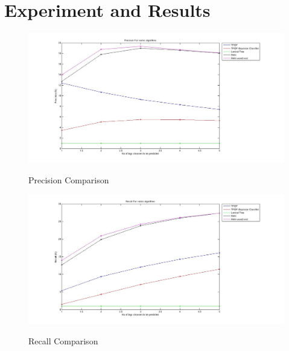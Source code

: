 \documentclass[dvips,9pt]{article}
\begin{document}
	\section{Experiment and Results}
		\begin{figure}
			\centering
			\caption{Precision Comparison}
			\includegraphics[scale=0.3]{../baseline/precision.jpg}
            \label{precision}
		\end{figure}
		\begin{figure}
			\centering
			\caption{Recall Comparison}
			\includegraphics[scale=0.3]{../baseline/recall.jpg}
            \label{recall}
		\end{figure}
\end{document}
